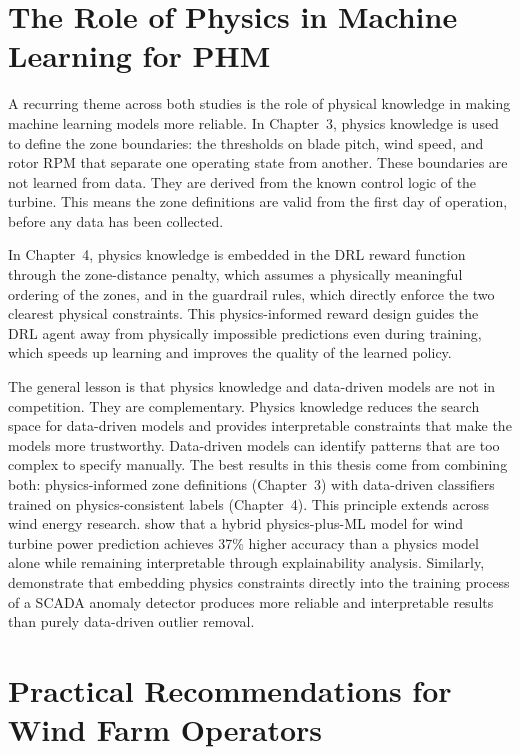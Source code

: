 \section{The Role of Physics in Machine Learning for PHM}
\label{sec:ch5:physics}

A recurring theme across both studies is the role of physical knowledge in making machine
learning models more reliable. In Chapter~3, physics knowledge is used to define the zone
boundaries: the thresholds on blade pitch, wind speed, and rotor RPM that separate one
operating state from another. These boundaries are not learned from data. They are derived
from the known control logic of the turbine. This means the zone definitions are valid
from the first day of operation, before any data has been collected.

In Chapter~4, physics knowledge is embedded in the DRL reward function through the
zone-distance penalty, which assumes a physically meaningful ordering of the zones, and
in the guardrail rules, which directly enforce the two clearest physical constraints.
This physics-informed reward design guides the DRL agent away from physically impossible
predictions even during training, which speeds up learning and improves the quality of
the learned policy.

The general lesson is that physics knowledge and data-driven models are not in
competition. They are complementary. Physics knowledge reduces the search space for
data-driven models and provides interpretable constraints that make the models more
trustworthy. Data-driven models can identify patterns that are too complex to specify
manually. The best results in this thesis come from combining both: physics-informed zone
definitions (Chapter~3) with data-driven classifiers trained on physics-consistent labels
(Chapter~4). This principle extends across wind energy research. \citet{gijon2025} show
that a hybrid physics-plus-ML model for wind turbine power prediction achieves 37\%
higher accuracy than a physics model alone while remaining interpretable through
explainability analysis. Similarly, \citet{hong2025} demonstrate that embedding physics
constraints directly into the training process of a SCADA anomaly detector produces more
reliable and interpretable results than purely data-driven outlier removal.

\section{Practical Recommendations for Wind Farm Operators}
\label{sec:ch5:recommendations}

